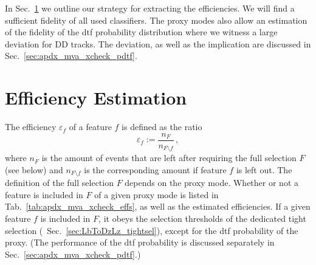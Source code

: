 In Sec.~\ref{sec:apdx_mva_xcheck_effest} we outline our strategy for extracting the efficiencies.
We will find a sufficient fidelity of all used classifiers.
The proxy modes also allow an estimation of the fidelity of the \gls{dtf} probability distribution where we witness a large deviation for \gls{DD} tracks.
The deviation, as well as the implication are discussed in Sec.~\ref{sec:apdx_mva_xcheck_pdtf}.

\section{Efficiency Estimation}
\label{sec:apdx_mva_xcheck_effest}
The efficiency $\varepsilon_f$ of a feature $f$ is defined as the ratio
\begin{equation*}
    \varepsilon_f := \frac{n_F}{n_{F \setminus f}} \,,
\end{equation*}
where $n_F$ is the amount of events that are left after requiring the full selection $F$ (see below) and $n_{F \setminus f}$ is the corresponding amount if feature $f$ is left out.
The definition of the full selection $F$ depends on the proxy mode.
Whether or not a feature is included in $F$ of a given proxy mode is listed in Tab.~\ref{tab:apdx_mva_xcheck_effs}, as well as the estimated efficiencies.
If a given feature $f$ is included in $F$, it obeys the selection thresholds of the dedicated \decay{\Lb}{\Dz\Lz} tight selection (\cf{}~Sec.~\ref{sec:LbToDzLz_tightsel}), except for the \gls{dtf} probability of the \decay{\Lb}{\Dz\proton\pim} proxy.
(The performance of the \gls{dtf} probability is discussed separately in Sec.~\ref{sec:apdx_mva_xcheck_pdtf}.)
